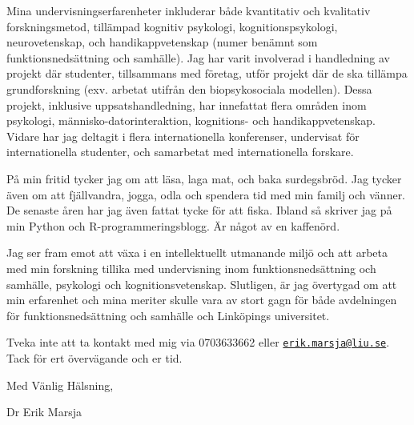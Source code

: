 \documentclass[]{article}
\begin{document}
\hfill\break
Mina undervisningserfarenheter inkluderar både kvantitativ och
kvalitativ forskningsmetod, tillämpad kognitiv psykologi,
kognitionspsykologi, neurovetenskap, och handikappvetenskap (numer
benämnt som funktionsnedsättning och samhälle). Jag har varit involverad
i handledning av projekt där studenter, tillsammans med företag, utför
projekt där de ska tillämpa grundforskning (exv. arbetat utifrån den
biopsykosociala modellen). Dessa projekt, inklusive uppsatshandledning,
har innefattat flera områden inom psykologi, människo-datorinteraktion,
kognitions- och handikappvetenskap. Vidare har jag deltagit i flera
internationella konferenser, undervisat för internationella studenter,
och samarbetat med internationella forskare.

På min fritid tycker jag om att läsa, laga mat, och baka surdegsbröd.
Jag tycker även om att fjällvandra, jogga, odla och spendera tid med min
familj och vänner. De senaste åren har jag även fattat tycke för att
fiska. Ibland så skriver jag på min Python och R-programmeringsblogg. Är
något av en kaffenörd.

\hfill\break
Jag ser fram emot att växa i en intellektuellt utmanande miljö och att
arbeta med min forskning tillika med undervisning inom
funktionsnedsättning och samhälle, psykologi och kognitionsvetenskap.
Slutligen, är jag övertygad om att min erfarenhet och mina meriter
skulle vara av stort gagn för både avdelningen för funktionsnedsättning
och samhälle och Linköpings universitet.

\hfill\break
Tveka inte att ta kontakt med mig via 0703633662 eller
\href{mailto:erik.marsja@liu.se}{\nolinkurl{erik.marsja@liu.se}}. Tack
för ert övervägande och er tid.

\hfill\break
Med Vänlig Hälsning,

\hfill\break
Dr Erik Marsja
\end{document}
